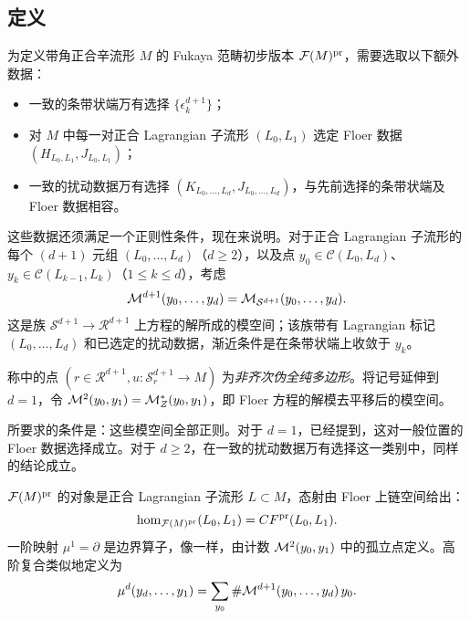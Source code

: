 \subsection{定义}\label{sec:9j}
为定义带角正合辛流形 $M$ 的 Fukaya 范畴初步版本 $\mathcal F(M)^{\mathrm{pr}}$，需要选取以下额外数据：
\begin{itemize}
\item 一致的条带状端万有选择 $\{\epsilon_k^{d+1}\}$；
\item 对 $M$ 中每一对正合 Lagrangian 子流形 $(L_0,L_1)$ 选定 Floer 数据 $(H_{L_0,L_1},J_{L_0,L_1})$；
\item 一致的扰动数据万有选择 $(K_{L_0,\ldots,L_d},J_{L_0,\ldots,L_d})$，与先前选择的条带状端及 Floer 数据相容。
\end{itemize}
这些数据还须满足一个正则性条件，现在来说明。对于正合 Lagrangian 子流形的每个 $(d+1)$ 元组 $(L_0,\ldots,L_d)$（$d\geq2$），以及点 $y_0\in\mathcal C(L_0,L_d)$、$y_k\in\mathcal C(L_{k-1},L_k)$（$1\leq k\leq d$），考虑
\begin{equation}\label{eq:9.22}
\mathcal M^{d+1}(y_0,\ldots,y_d)=\mathcal M_{\mathcal S^{d+1}}(y_0,\ldots,y_d).
\end{equation}
这是族 $\mathcal S^{d+1}\to\mathcal R^{d+1}$ 上方程的解所成的模空间；该族带有 Lagrangian 标记 $(L_0,\ldots,L_d)$ 和已选定的扰动数据，渐近条件是在条带状端上收敛于 $y_k$。
\begin{definition*}
称中的点 $(r\in\mathcal R^{d+1},u:\mathcal S_r^{d+1}\to M)$ 为\emph{非齐次伪全纯多边形}。将记号延伸到 $d=1$，令
$\mathcal M^2(y_0,y_1)=\mathcal M_Z^*(y_0,y_1)$，即 Floer 方程的解模去平移后的模空间。
\end{definition*}
所要求的条件是：这些模空间全部正则。对于 $d=1$，已经提到，这对一般位置的 Floer 数据选择成立。对于 $d\geq2$，在一致的扰动数据万有选择这一类别中，同样的结论成立。
\begin{definition*}
$\mathcal F(M)^{\mathrm{pr}}$ 的对象是正合 Lagrangian 子流形 $L\subset M$，态射由 Floer 上链空间给出：
\[
\hom_{\mathcal F(M)^{\mathrm{pr}}}(L_0,L_1)=CF^{\mathrm{pr}}(L_0,L_1).
\]
一阶映射 $\mu^1=\partial$ 是边界算子，像一样，由计数 $\mathcal M^2(y_0,y_1)$ 中的孤立点定义。高阶复合类似地定义为
\begin{equation}\label{eq:9.23}
\mu^d(y_d,\ldots,y_1)=\sum_{y_0}\#\mathcal M^{d+1}(y_0,\ldots,y_d)\,y_0.
\end{equation}

\end{definition*}
